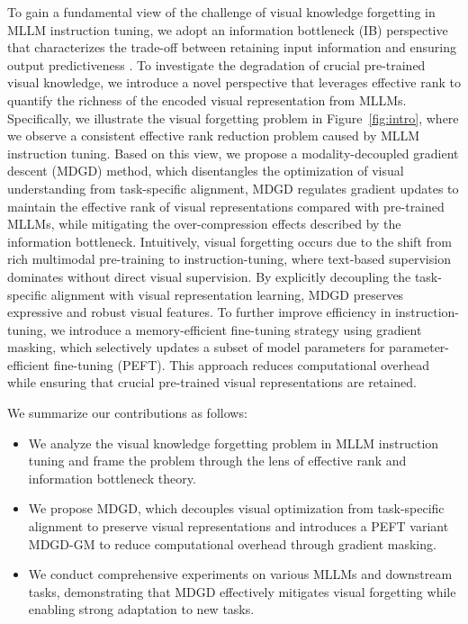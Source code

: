 To gain a fundamental view of the challenge of visual knowledge forgetting in MLLM instruction tuning, 
we adopt an information bottleneck (IB) perspective that characterizes the trade-off between retaining input information and ensuring output predictiveness \cite{tishby2000information}.
To investigate the degradation of crucial pre-trained visual knowledge, we introduce a novel perspective that leverages effective rank to quantify the richness of the encoded visual representation from MLLMs.
Specifically, we illustrate the visual forgetting problem in Figure~\ref{fig:intro}, where we observe a consistent effective rank reduction problem caused by MLLM instruction tuning.
Based on this view, we propose a modality-decoupled gradient descent (MDGD) method, which disentangles the optimization of visual understanding from task-specific alignment,
MDGD regulates gradient updates to maintain the effective rank of visual representations compared with pre-trained MLLMs,
while mitigating the over-compression effects described by the information bottleneck. 
Intuitively, visual forgetting occurs due to the shift from rich multimodal pre-training to instruction-tuning, 
where text-based supervision dominates without direct visual supervision. 
By explicitly decoupling the task-specific alignment with visual representation learning, MDGD preserves expressive and robust visual features. 
To further improve efficiency in instruction-tuning, we introduce a memory-efficient fine-tuning strategy using gradient masking, 
which selectively updates a subset of model parameters for parameter-efficient fine-tuning (PEFT).
This approach reduces computational overhead while ensuring that crucial pre-trained visual representations are retained.


We summarize our contributions as follows: 
\begin{itemize}
\item We analyze the visual knowledge forgetting problem in MLLM instruction tuning and frame the problem through the lens of effective rank and information bottleneck theory.
\item We propose MDGD, which decouples visual optimization from task-specific alignment to preserve visual representations and introduces a PEFT variant MDGD-GM to reduce computational overhead through gradient masking. 
\item We conduct comprehensive experiments on various MLLMs and downstream tasks, demonstrating that MDGD effectively mitigates visual forgetting while enabling strong adaptation to new tasks.
\end{itemize}





